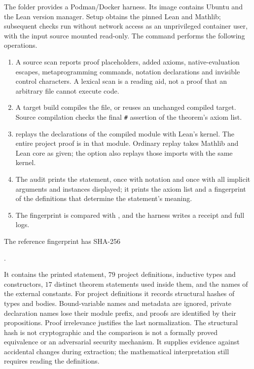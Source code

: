 \documentclass[11pt,a4paper]{article}
\newcommand{\leanhash}{\texttt{\#}}
\theoremstyle{definition}
\theoremstyle{remark}
\numberwithin{equation}{section}
\begin{document}
The folder  provides a Podman/Docker harness. Its image contains Ubuntu and the Lean version manager. Setup obtains the pinned Lean and Mathlib; subsequent checks run without network access as an unprivileged container user, with the input source mounted read-only. The command  performs the following operations.
\begin{enumerate}[label=(\roman*)]
\item A source scan reports proof placeholders, added axioms, native-evaluation escapes, metaprogramming commands, notation declarations and invisible control characters. A lexical scan is a reading aid, not a proof that an arbitrary file cannot execute code.
\item A target build compiles the file, or reuses an unchanged compiled target. Source compilation checks the final \leanhash{} assertion of the theorem's axiom list.
\item {} replays the declarations of the compiled module with Lean's kernel. The entire project proof is in that module. Ordinary replay takes Mathlib and Lean core as given; the option  also replays those imports with the same kernel.
\item The audit prints the statement, once with notation and once with all implicit arguments and instances displayed; it prints the axiom list and a fingerprint of the definitions that determine the statement's meaning.
\item The fingerprint is compared with , and the harness writes a receipt and full logs.
\end{enumerate}
The reference fingerprint has SHA-256
\begin{center}\small
{}.
\end{center}
It contains the printed statement, $79$ project definitions, inductive types and constructors, $17$ distinct theorem statements used inside them, and the names of the external constants. For project definitions it records structural hashes of types and bodies. Bound-variable names and metadata are ignored, private declaration names lose their module prefix, and proofs are identified by their propositions. Proof irrelevance justifies the last normalization. The structural hash is not cryptographic and the comparison is not a formally proved equivalence or an adversarial security mechanism. It supplies evidence against accidental changes during extraction; the mathematical interpretation still requires reading the definitions.
\end{document}
